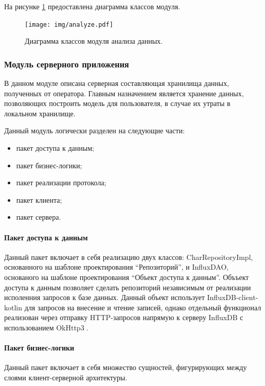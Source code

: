 На рисунке \ref{fig:analyzerUml} предоставлена диаграмма классов модуля.

\begin{figure}[H]
	\centering
	\texttt{[image: img/analyze.pdf]}
	\caption{Диаграмма классов модуля анализа данных.}
	\label{fig:analyzerUml}
\end{figure}

\subsubsection{Модуль серверного приложения}
В данном модуле описана серверная составляющая хранилища данных, полученных от оператора. Главным назначением является хранение данных, позволяющих построить модель для пользователя, в случае их утраты в локальном хранилище.

Данный модуль логически разделен на следующие части:

\begin{itemize}[leftmargin=1.6\parindent]
\item пакет доступа к данным;
\item пакет бизнес-логики;
\item пакет реализации протокола;
\item пакет клиента;
\item пакет сервера.
\end{itemize}

\paragraph{Пакет доступа к данным \newline}
Данный пакет включает в себя реализацию двух классов: CharRepositoryImpl, основанного на шаблоне проектирования ``Репозиторий'', и InfluxDAO, основаного на шаблоне проектирования ``Объект доступа к данным''. Объъект доступа к данным позволяет сделать репозиторий независимым от реализации исполенния запросов к базе данных. Данный объект использует InfluxDB-client-kotlin \cite{influxClientKotlin} для запросов на внесение и чтение записей, однако отдельный функционал реализован через отправку HTTP-запросов напрямую к серверу InfluxDB с использованием OkHttp3 \cite{OkHttp}.

\paragraph{Пакет бизнес-логики \newline}
Данный пакет включает в себя множество сущностей, фигурирующих между слоями клиент-серверной архитектуры.

